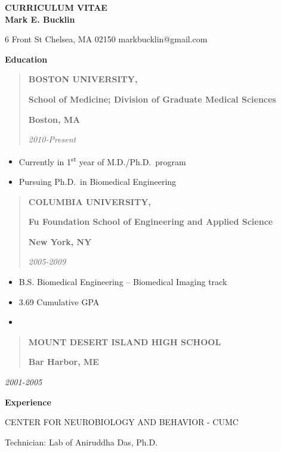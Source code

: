 
\thispagestyle{empty}

\begin{center}
{\LARGE {\bf CURRICULUM VITAE}}\\
\vspace{0.5in}
{\large {\bf Mark E. Bucklin}}
\end{center}

6 Front St
Chelsea, MA 02150
markbucklin@gmail.com

\textbf{Education}

\begin{quote}
\textbf{BOSTON UNIVERSITY,}

\textbf{School of Medicine; Division of Graduate Medical Sciences}

\textbf{Boston, MA}

\emph{2010-Present}
\end{quote}

\begin{itemize}
\item
  Currently in 1\textsuperscript{st} year of M.D./Ph.D.~program
\item
  Pursuing Ph.D.~in Biomedical Engineering
\end{itemize}

\begin{quote}
\textbf{COLUMBIA UNIVERSITY,}

\textbf{Fu Foundation School of Engineering and Applied Science}

\textbf{New York, NY}

\emph{2005-2009}
\end{quote}

\begin{itemize}
\item
  B.S. Biomedical Engineering -- Biomedical Imaging track
\item
  3.69 Cumulative GPA
\item
\end{itemize}

\begin{quote}
\textbf{MOUNT DESERT ISLAND HIGH SCHOOL}

\textbf{Bar Harbor, ME}
\end{quote}

\emph{2001-2005}

\textbf{Experience}

CENTER FOR NEUROBIOLOGY AND BEHAVIOR - CUMC

Technician: Lab of Aniruddha Das, Ph.D.

